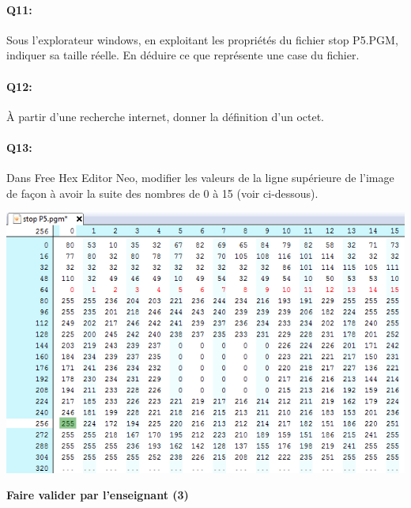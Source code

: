 \documentclass{article}
\begin{document}
\paragraph{Q11:}
Sous l'explorateur windows, en exploitant les propriétés du fichier \og{}stop P5.PGM\fg{}, indiquer sa taille réelle. 
En déduire ce que représente une case du fichier.

\vspace{1em}
\begin{Form}
	\TextField[name=r11,width=\linewidth,height=5em,multiline=true]{}
\end{Form}

\newpage

\paragraph{Q12:}
À partir d'une recherche internet, donner la définition d'un octet.

\vspace{1em}
\begin{Form}
	\TextField[name=r12,width=\linewidth,height=5em,multiline=true]{}
\end{Form}

\paragraph{Q13:}
Dans \og{}Free Hex Editor Neo\fg{}, modifier les valeurs de la ligne supérieure de l'image de façon à avoir la suite des nombres de 0 à 15 (voir ci-dessous).

\begin{center}
	\includegraphics[width=.8\linewidth]{./figures/hex_0to15.png}
\end{center}

\begin{center}
	\Large
	\textbf{Faire valider par l'enseignant (3)}
\end{center}
\end{document}
